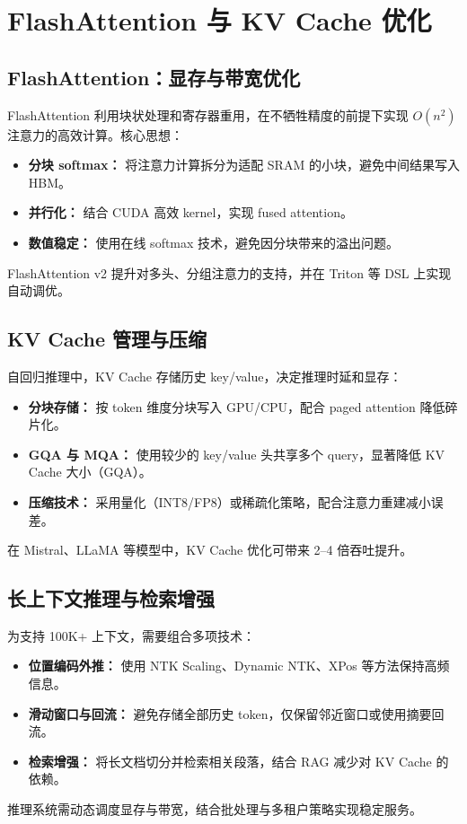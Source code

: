 \documentclass[UTF8,zihao=-4]{ctexart}
\begin{document}
\section{FlashAttention 与 KV Cache 优化}
\subsection{FlashAttention：显存与带宽优化}
FlashAttention 利用块状处理和寄存器重用，在不牺牲精度的前提下实现 $O(n^2)$ 注意力的高效计算。核心思想：
\begin{itemize}
  \item \textbf{分块 softmax：} 将注意力计算拆分为适配 SRAM 的小块，避免中间结果写入 HBM。
  \item \textbf{并行化：} 结合 CUDA 高效 kernel，实现 fused attention。
  \item \textbf{数值稳定：} 使用在线 softmax 技术，避免因分块带来的溢出问题。
\end{itemize}
FlashAttention v2 提升对多头、分组注意力的支持，并在 Triton 等 DSL 上实现自动调优。

\subsection{KV Cache 管理与压缩}
自回归推理中，KV Cache 存储历史 key/value，决定推理时延和显存：
\begin{itemize}
  \item \textbf{分块存储：} 按 token 维度分块写入 GPU/CPU，配合 paged attention 降低碎片化。
  \item \textbf{GQA 与 MQA：} 使用较少的 key/value 头共享多个 query，显著降低 KV Cache 大小（GQA）。
  \item \textbf{压缩技术：} 采用量化（INT8/FP8）或稀疏化策略，配合注意力重建减小误差。
\end{itemize}
在 Mistral、LLaMA 等模型中，KV Cache 优化可带来 2--4 倍吞吐提升。

\subsection{长上下文推理与检索增强}
为支持 100K+ 上下文，需要组合多项技术：
\begin{itemize}
  \item \textbf{位置编码外推：} 使用 NTK Scaling、Dynamic NTK、XPos 等方法保持高频信息。
  \item \textbf{滑动窗口与回流：} 避免存储全部历史 token，仅保留邻近窗口或使用摘要回流。
  \item \textbf{检索增强：} 将长文档切分并检索相关段落，结合 RAG 减少对 KV Cache 的依赖。
\end{itemize}
推理系统需动态调度显存与带宽，结合批处理与多租户策略实现稳定服务。
\end{document}

